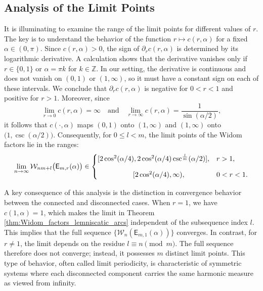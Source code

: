 \documentclass[12pt,oneside,reqno]{amsart}
\theoremstyle{definition}
\numberwithin{equation}{section}
\newcommand{\Z}{{\mathbb Z}}
\newcommand{\E}{{\mathsf E}}
\newcommand{\cW}{{\mathcal{W}}}
\begin{document}
\subsection{Analysis of the Limit Points}
It is illuminating to examine the range of the limit points for different values of $r$. The key is to understand the behavior of the function $r\mapsto c(r,\alpha)$ for a fixed $\alpha\in (0,\pi)$. Since $c(r,\alpha)>0$, the sign of $\partial_rc(r,\alpha)$ is determined by its logarithmic derivative. A calculation shows that the derivative vanishes only if $r \in \{0,1\}$ or $\alpha = \pi k$ for $k\in\Z$. In our setting, the derivative is continuous and does not vanish on $(0,1)$ or $(1,\infty)$, so it must have a constant sign on each of these intervals. We conclude that $\partial_r c(r,\alpha)$ is negative for $0<r<1$ and positive for $r>1$. 
Moreover, since 
\[
   \lim_{r\rightarrow 0}c(r,\alpha) = \infty
   \quad \mbox{and} \quad
   \lim_{r\rightarrow \infty}c(r,\alpha) = \frac{1}{\sin(\alpha/2)},
\] 
it follows that $c(\cdot,\alpha)$ maps $(0,1)$ onto $(1,\infty)$ and $(1,\infty)$ onto $\bigl(1, \csc(\alpha/2)\bigr)$. Consequently, for $0\leq l<m$, the limit points of the Widom factors lie in the ranges:
\[
\lim_{n\rightarrow \infty}\cW_{nm+l}\bigl(\E_{m,r}(\alpha)\bigr) \in \begin{cases}
	[2\cos^2(\alpha/4), 2\cos^2(\alpha/4)\csc^{\frac{l}{m}}(\alpha/2)], & r> 1, \vspace{.3cm}\\
	\qquad\qquad\quad [2\cos^2(\alpha/4),\infty), & 0<r<1.
\end{cases}
\]

A key consequence of this analysis is the distinction in convergence behavior between the connected and disconnected cases. When $r=1$, we have $c(1,\alpha)=1$, which makes the limit in Theorem \ref{thm:Widom_factors_lemniscatic_arcs} independent of the subsequence index $l$. This implies that the full sequence $\{\cW_n(\E_{m,1}(\alpha))\}$ converges. In contrast, for $r\neq 1$, the limit depends on the residue $l \equiv n \pmod m$. The full sequence therefore does not converge; instead, it possesses $m$ distinct limit points. This type of behavior, often called limit periodicity, is characteristic of symmetric systems where each disconnected component carries the same harmonic measure as viewed from infinity. %
\end{document}
